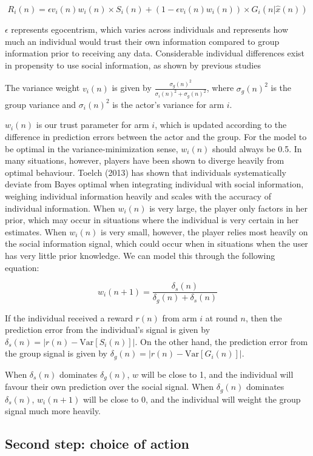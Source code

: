 \documentclass[11pt, a4paper]{article}
\begin{document}
$$R_i(n) = \epsilon v_i(n)w_i(n) \times S_i(n) + (1 - \epsilon v_i(n)w_i(n)) \times G_{i}(n|\hat{x}(n))$$

$\epsilon$ represents egocentrism, which varies across individuals and represents how much an individual would trust their own information compared to group information prior to receiving any data. Considerable individual differences exist in propensity to use social information, as shown by previous studies \cite{EFFERSON_2008}

The variance weight $v_i(n)$ is given by $\frac{\sigma_{g}(n)^2}{\sigma_{i}(n)^2 + \sigma_{g}(n)^2}$, where $\sigma_{g}(n)^2$ is the group variance and $\sigma_{i}(n)^2$ is the actor's variance for arm $i$. 

$w_i(n)$ is our trust parameter for arm $i$, which is updated according to the difference in prediction errors between the actor and the group. For the model to be optimal in the variance-minimization sense, $w_i(n)$ should always be 0.5. In many situations, however, players have been shown to diverge heavily from optimal behaviour. Toelch (2013) has shown that individuals systematically deviate from Bayes optimal when integrating individual with social information, weighing individual information heavily and scales with the accuracy of individual information. When $w_i(n)$ is very large, the player only factors in her prior, which may occur in situations where the individual is very certain in her estimates. When $w_i(n)$ is very small, however, the player relies most heavily on the social information signal, which could occur when in situations when the user has very little prior knowledge. We can model this through the following equation:

$$w_i(n+1) = \frac{\delta_s(n)}{\delta_g(n) + \delta_s(n)}$$

If the individual received a reward $r(n)$ from arm $i$ at round $n$, then the prediction error from the individual's signal is given by $\delta_s(n) = \left|r(n) - \mathrm{Var}[S_i(n)]\right|$. On the other hand, the prediction error from the group signal is given by $\delta_g(n) = \left|r(n) - \mathrm{Var}[G_i(n)]\right|$.

When $\delta_s(n)$ dominates $\delta_g(n)$, $w$ will be close to 1, and the individual will favour their own prediction over the social signal. When $\delta_g(n)$ dominates $\delta_s(n)$, $w_i(n+1)$ will be close to 0, and the individual will weight the group signal much more heavily.

\subsection{Second step: choice of action}
\end{document}

